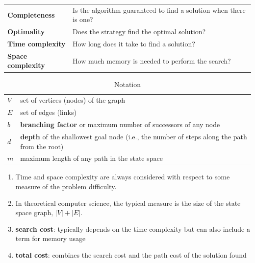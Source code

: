 \begin{customTableWrapper}{1.2}
\begin{table}[H]
    \centering
    \begin{tabular}{l p{10cm}}
        \textbf{Completeness} & Is the algorithm guaranteed to find a solution when there is one? \\
        
        \textbf{Optimality} & Does the strategy find the optimal solution? \\
        
        \textbf{Time complexity} & How long does it take to find a solution? \\
        
        \textbf{Space complexity} & How much memory is needed to perform the search?\\
    \end{tabular}
\end{table}
\end{customTableWrapper}


\begin{customTableWrapper}{1.2}
\begin{table}[H]
    \centering
    \begin{tabular}{l p{10cm}}
        $V$ & set of vertices (nodes) of the graph \\
        
        $E$ & set of edges (links) \\

        $b$ & \textbf{branching factor} or maximum number of successors of any node\\

        $d$ & \textbf{depth} of the shallowest goal node (i.e., the number of steps along the path from the root)\\

        $m$ &  maximum length of any path in the state space\\
    \end{tabular}
    \caption*{Notation}
\end{table}
\end{customTableWrapper}



\begin{enumerate}
    \item Time and space complexity are always considered with respect to some measure of the problem difficulty. 
    
    \item In theoretical computer science, the typical measure is the size of the state space graph, $|V| + |E|$.

    \item \textbf{search cost}: typically depends on the time complexity but can also include a term for memory usage

    \item \textbf{total cost}: combines the search cost and the path cost of the solution found
\end{enumerate}





